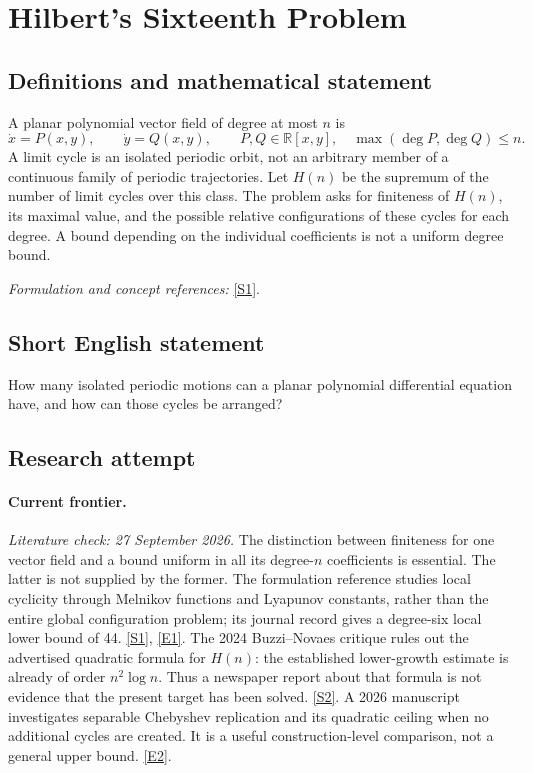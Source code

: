 \documentclass[11pt,a4paper]{article}
\newcommand{\R}{\mathbb{R}}
\newcommand{\sref}[2]{\hyperlink{source:#1:#2}{[S#2]}}
\newcommand{\eref}[2]{\hyperlink{extra:#1:#2}{[E#2]}}
\newif\ifshowcatalogue
\newcommand{\cataloguescope}[1]{\ifshowcatalogue
 \paragraph{Exact scope in the supplied catalogue.}
 \begin{quote}\small #1\end{quote}\fi}
\numberwithin{equation}{section}
\begin{document}
\setcounter{section}{0}
\clearpage
\section*{\texorpdfstring{Hilbert's Sixteenth Problem}{Hilbert's Sixteenth Problem}}\label{statement}
\subsection{Definitions and mathematical statement}
A planar polynomial vector field of degree at most $n$ is
\[
 \dot x=P(x,y),\qquad\dot y=Q(x,y),\qquad P,Q\in\R[x,y],\quad\max(\deg P,\deg Q)\le n.
\]
A limit cycle is an isolated periodic orbit, not an arbitrary member of a continuous family of periodic trajectories. Let $H(n)$ be the supremum of the number of limit cycles over this class. The problem asks for finiteness of $H(n)$, its maximal value, and the possible relative configurations of these cycles for each degree. A bound depending on the individual coefficients is not a uniform degree bound.
\par\smallskip\textit{Formulation and concept references:} \sref{statement}{1}.
\cataloguescope{For every degree n >= 2, prove finiteness and determine the maximal number and possible configurations of limit cycles of planar polynomial vector fields of degree n.}
\subsection{Short English statement}
How many isolated periodic motions can a planar polynomial differential equation have, and how can those cycles be arranged?
\subsection{Research attempt}
\paragraph{Current frontier.}
\textit{Literature check: 27 September 2026.}
The distinction between finiteness for one vector field and a bound uniform
in all its degree-$n$ coefficients is essential. The latter is not supplied
by the former. The formulation reference studies local cyclicity through
Melnikov functions and Lyapunov constants, rather than the entire global
configuration problem; its journal record gives a degree-six local lower
bound of 44. \sref{statement}{1}, \eref{statement}{1}.
The 2024 Buzzi--Novaes critique rules out the advertised quadratic formula
for $H(n)$: the established lower-growth estimate is already of order
$n^2\log n$. Thus a newspaper report about that formula is not evidence
that the present target has been solved. \sref{statement}{2}.
A 2026 manuscript investigates separable Chebyshev replication and its
quadratic ceiling when no additional cycles are created. It is a useful
construction-level comparison, not a general upper bound. \eref{statement}{2}.
\end{document}
